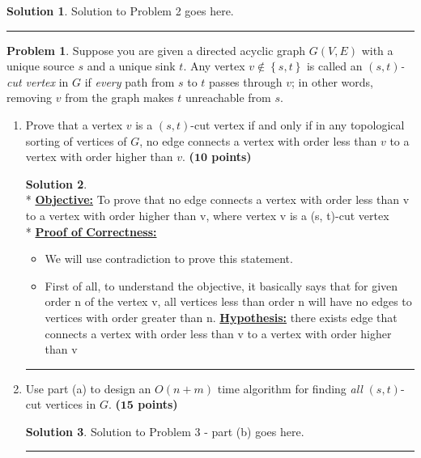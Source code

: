 \documentclass{article}
\theoremstyle{definition}
\newtheorem{problem}{Problem}
\def\fline{\rule{0.75\linewidth}{0.5pt}}
\newcommand{\finishline}{\vspace{-15pt}\begin{center}\fline\end{center}}
\newtheorem*{solution*}{Solution}
\newenvironment{solution}{\begin{solution*}}{{\finishline} \end{solution*}}
\newcommand{\grade}[1]{\hfill{\textbf{($\mathbf{#1}$ points)}}}
\newcommand{\set}[1]{\ensuremath{\left\{ #1 \right\}}}
\begin{document}
\begin{solution}
	Solution to Problem 2 goes here.
\end{solution}

\smallskip

\begin{problem}
	Suppose you are given a directed acyclic graph $G(V,E)$ with a unique source $s$ and a unique sink $t$. Any vertex $v \notin \set{s,t}$ is called an \emph{$(s,t)$-cut vertex} in $G$ if \emph{every} path from $s$ to $t$ passes through 
	$v$; in other words, removing $v$ from the graph makes $t$ unreachable from $s$. 
	
		\begin{enumerate}[label=(\alph*)]
		\item Prove that a vertex $v$ is a $(s,t)$-cut vertex if and only if in any topological sorting of vertices of $G$, no edge connects a vertex with order less than $v$ to a vertex with order higher than $v$. \grade{10}
		
	\smallskip
		
\begin{solution}
\hfill \bigskip\\*
	\textbf{\underline{Objective:}} To prove that no edge connects a vertex with order less than v to a vertex with order higher than v, where vertex v is a (s, t)-cut vertex \bigskip\\*
	\textbf{\underline{Proof of Correctness:}}
		\begin{itemize}
			\item We will use contradiction to prove this statement.
			\item First of all, to understand the objective, it basically says that for given order n of the vertex v, all vertices less than order n will have no edges to vertices with order greater than n.
			\textbf{\underline{Hypothesis:}} there exists edge that connects a vertex with order less than v to a vertex with order higher than v
			
	\end{itemize} 
\end{solution}

		\item Use part (a) to design an $O(n+m)$ time algorithm for finding \emph{all} $(s,t)$-cut vertices in $G$.  \grade{15}
		
		\smallskip
		
		\begin{solution}
	Solution to Problem 3 - part (b) goes here.
\end{solution}

	\end{enumerate}
	
\end{problem}
\end{document}
